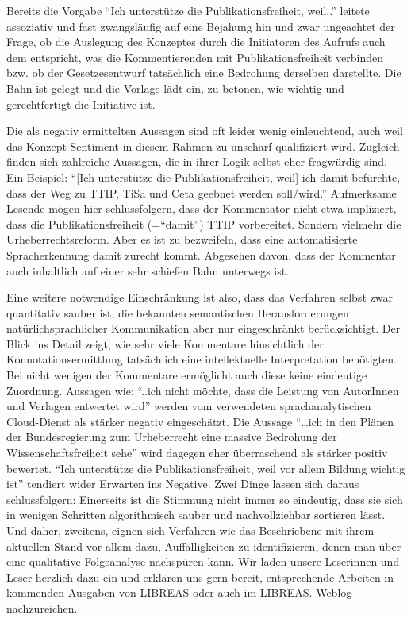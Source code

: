 \documentclass[a4paper,
fontsize=11pt,
oneside,
numbers=noperiodatend,
parskip=half-,
bibliography=totoc,
final
]{scrartcl}
\begin{document}
Bereits die Vorgabe \enquote{Ich unterstütze die Publikationsfreiheit,
weil..} leitete assoziativ und fast zwangsläufig auf eine Bejahung hin
und zwar ungeachtet der Frage, ob die Auslegung des Konzeptes durch die
Initiatoren des Aufrufs auch dem entspricht, was die Kommentierenden mit
Publikationsfreiheit verbinden bzw. ob der Gesetzesentwurf tatsächlich
eine Bedrohung derselben darstellte. Die Bahn ist gelegt und die Vorlage
lädt ein, zu betonen, wie wichtig und gerechtfertigt die Initiative ist.

Die als negativ ermittelten Aussagen sind oft leider wenig einleuchtend,
auch weil das Konzept Sentiment in diesem Rahmen zu unscharf
qualifiziert wird. Zugleich finden sich zahlreiche Aussagen, die in
ihrer Logik selbst eher fragwürdig sind. Ein Beispiel: \enquote{{[}Ich
unterstütze die Publikationsfreiheit, weil{]} ich damit befürchte, dass
der Weg zu TTIP, TiSa und Ceta geebnet werden soll/wird.} Aufmerksame
Lesende mögen hier schlussfolgern, dass der Kommentator nicht etwa
impliziert, dass die Publikationsfreiheit (=\enquote{damit}) TTIP
vorbereitet. Sondern vielmehr die Urheberrechtsreform. Aber es ist zu
bezweifeln, dass eine automatisierte Spracherkennung damit zurecht
kommt. Abgesehen davon, dass der Kommentar auch inhaltlich auf einer
sehr schiefen Bahn unterwegs ist.

Eine weitere notwendige Einschränkung ist also, dass das Verfahren
selbst zwar quantitativ sauber ist, die bekannten semantischen
Herausforderungen natürlichsprachlicher Kommunikation aber nur
eingeschränkt berücksichtigt. Der Blick ins Detail zeigt, wie sehr viele
Kommentare hinsichtlich der Konnotationsermittlung tatsächlich eine
intellektuelle Interpretation benötigten. Bei nicht wenigen der
Kommentare ermöglicht auch diese keine eindeutige Zuordnung. Aussagen
wie: \enquote{..ich nicht möchte, dass die Leistung von AutorInnen und
Verlagen entwertet wird} werden vom verwendeten sprachanalytischen
Cloud-Dienst als stärker negativ eingeschätzt. Die Aussage
\enquote{\ldots{}ich in den Plänen der Bundesregierung zum Urheberrecht
eine massive Bedrohung der Wissenschaftsfreiheit sehe} wird dagegen eher
überraschend als stärker positiv bewertet. \enquote{Ich unterstütze die
Publikationsfreiheit, weil vor allem Bildung wichtig ist} tendiert wider
Erwarten ins Negative. Zwei Dinge lassen sich daraus schlussfolgern:
Einerseits ist die Stimmung nicht immer so eindeutig, dass sie sich in
wenigen Schritten algorithmisch sauber und nachvollziehbar sortieren
lässt. Und daher, zweitens, eignen sich Verfahren wie das Beschriebene
mit ihrem aktuellen Stand vor allem dazu, Auffälligkeiten zu
identifizieren, denen man über eine qualitative Folgeanalyse nachspüren
kann. Wir laden unsere Leserinnen und Leser herzlich dazu ein und
erklären uns gern bereit, entsprechende Arbeiten in kommenden Ausgaben
von LIBREAS oder auch im LIBREAS. Weblog nachzureichen.
\end{document}
